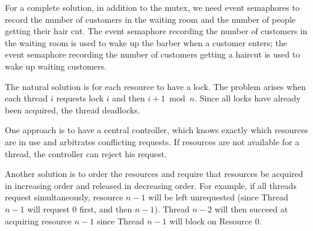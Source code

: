 For a complete solution, in addition to the mutex, we need event semaphores
to record the number of customers in 
the waiting room and the number of people getting their hair cut.
The event semaphore recording the number of customers in the waiting room
is used to wake up the barber when a customer enters; the event
semaphore recording the number of customers getting a haircut
is used to wake up waiting customers.

The natural solution is for each resource to have a lock.
The problem arises when each thread $i$ requests lock $i$ and
then $i+1 \bmod{n}$.  Since all locks have already been acquired, 
the thread deadlocks.

One approach is to have a central controller, which 
knows exactly which resources are in use and arbitrates conflicting requests.
If resources are not available for a thread,
the controller can reject his request.

Another solution is to order the resources and require that resources be
acquired in increasing order and released in decreasing order.
For example, if all threads request simultaneously, resource $n-1$
will be left unrequested (since Thread $n-1$ will request
$0$ first, and then $n-1$).  Thread $n-2$ will then succeed at 
acquiring resource $n-1$ since Thread $n-1$ will block on Resource $0$.

\begin{comment}
The example below shows a solution where the chopsticks are not represented explicitly. 
Philosophers can eat if none of their neighbors are eating. 
This is comparable to a system where philosophers that cannot get the second chopstick must put down the first chopstick before they try again.

In the absence of locks associated with the resources, threads must ensure
that the decision to enter $m$ is not based on stale information about the
state of its neighbors. If Thread 2 sees that Thread 1 does not
hold resource 1, then Thread 2 looks at Thread 3, Thread 1 could take resource 1
while Thread 2 looks at Thread 3. This problem can be avoided
by using a single mutual exclusion lock not associated with the resources but
with the decision procedures that can change the states of the philosophers.
This is ensured by the monitor. The procedures test, pickup, and putdown are
local to the monitor and share a mutual exclusion lock. Notice that threads
calling \texttt{WAITC(x)} release the lock and wait on the variable \texttt{x} 
until another thread calls \texttt{SIGNALC(x)} on the same variable. 
When the process that called \texttt{WAITC} resumes, it will have reacquired the lock.
\end{comment}

